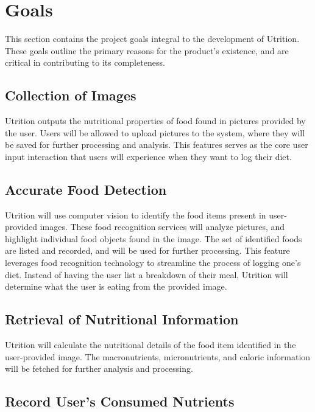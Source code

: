 \documentclass{article}
\begin{document}

\section{Goals}

This section contains the project goals integral to the development of 
Utrition. These goals outline the primary reasons for the product's existence, 
and are critical in contributing to its completeness.

\subsection{Collection of Images}

Utrition outputs the nutritional properties of food found in pictures 
provided by the user. Users will be allowed to upload pictures to the system, 
where they will be saved for further processing and analysis. This features 
serves as the core user input interaction that users will experience when they 
want to log their diet.

\subsection{Accurate Food Detection}

Utrition will use computer vision to identify the food items present in 
user-provided images. These food recognition services will analyze pictures, 
and highlight individual food objects found in the image. The set of identified 
foods are listed and recorded, and will be used for further processing. This 
feature leverages food recognition technology to streamline the process of 
logging one's diet. Instead of having the user list a breakdown of their meal, 
Utrition will determine what the user is eating from the provided image.

\subsection{Retrieval of Nutritional Information}

Utrition will calculate the nutritional details of the food item identified in the user-provided image. The macronutrients, micronutrients, and caloric information will be fetched for further analysis and processing.

\subsection{Record User's Consumed Nutrients}
\end{document}
